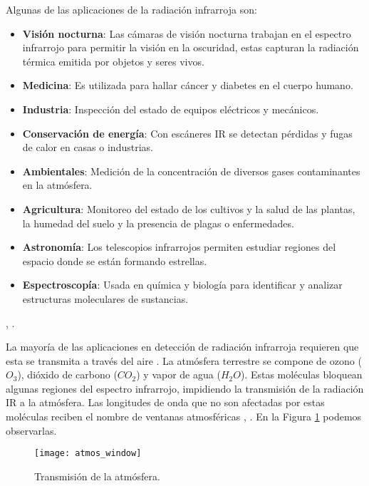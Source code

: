             
Algunas de las aplicaciones de la radiación infrarroja son:
			\begin{itemize}
				\item \textbf{Visión nocturna}: Las cámaras de visión nocturna trabajan en el espectro infrarrojo para permitir la visión en la oscuridad, estas capturan la radiación térmica emitida por objetos y seres vivos.
				\item \textbf{Medicina}: Es utilizada para hallar cáncer y diabetes en el cuerpo humano.
				\item \textbf{Industria}: Inspección del estado de equipos eléctricos y mecánicos.
				\item \textbf{Conservación de energía}: Con escáneres IR se detectan pérdidas y fugas de calor en casas o industrias.
				\item \textbf{Ambientales}: Medición de la concentración de diversos gases contaminantes en la atmósfera.
				\item \textbf{Agricultura}: Monitoreo del estado de los cultivos y la salud de las plantas, la humedad del suelo y la presencia de plagas o enfermedades.
				\item \textbf{Astronomía}: Los telescopios infrarrojos permiten estudiar regiones del espacio donde se están formando estrellas.
				\item \textbf{Espectroscopía}: Usada en química y biología para identificar y analizar estructuras moleculares de sustancias.		
			\end{itemize}
\cite{Rogalski}, \cite{BlancoMDA}.

La mayoría de las aplicaciones en detección de radiación infrarroja requieren que esta se transmita a través del aire \cite{Jimenez}. La atmósfera terrestre se compone de ozono ($O_{3}$), dióxido de carbono ($CO_{2}$) y vapor de agua ($H_{2}O$). Estas moléculas bloquean algunas regiones del espectro infrarrojo, impidiendo la transmisión de la radiación IR a la atmósfera. Las longitudes de onda que no son afectadas por estas moléculas reciben el nombre de ventanas atmosféricas \cite{Rogalski}, \cite{Motilal}. En la Figura \ref{fig:atmos_window} podemos observarlas.

            \begin{figure}[hbtp]
                \centering
                \texttt{[image: atmos\_window]}
                \caption{Transmisión de la atmósfera.}
                \label{fig:atmos_window}
            \end{figure}



